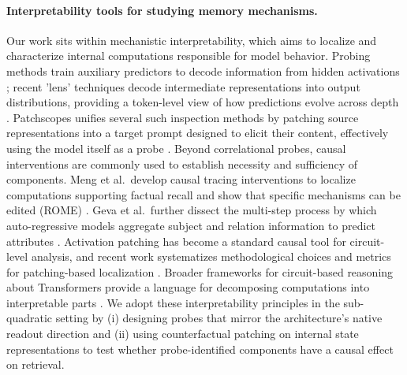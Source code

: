 \paragraph{Interpretability tools for studying memory mechanisms.}
Our work sits within mechanistic interpretability, which aims to localize and
characterize internal computations responsible for model behavior. Probing
methods train auxiliary predictors to decode information from hidden
activations \cite{hewitt2019structural,gurnee2024language,engels2024notall}; recent 'lens' techniques decode intermediate representations into
output distributions, providing a token-level view of how predictions evolve
across depth \cite{belrose2023tunedlens}. Patchscopes unifies several such
inspection methods by patching source representations into a target prompt
designed to elicit their content, effectively using the model itself as a probe
\cite{ghandeharioun2024patchscopes,chen2024selfie}. Beyond correlational probes, causal
interventions are commonly used to establish necessity and sufficiency of
components. Meng et al.\ develop causal tracing interventions to localize
computations supporting factual recall and show that specific mechanisms can be
edited (ROME) \cite{meng2022rome}. Geva et al.\ further dissect the multi-step process by which auto-regressive models aggregate subject and relation information to predict attributes \cite{geva2023dissecting}. Activation patching has become a standard causal tool for circuit-level analysis, and
recent work systematizes methodological choices and metrics for patching-based
localization \cite{zhang2023patching}. Broader frameworks for circuit-based
reasoning about Transformers provide a language for decomposing computations
into interpretable parts \cite{elhage2021framework}. We adopt these
interpretability principles in the sub-quadratic setting by (i) designing probes
that mirror the architecture's native readout direction and (ii) using
counterfactual patching on internal state representations to test whether
probe-identified components have a causal effect on retrieval.
